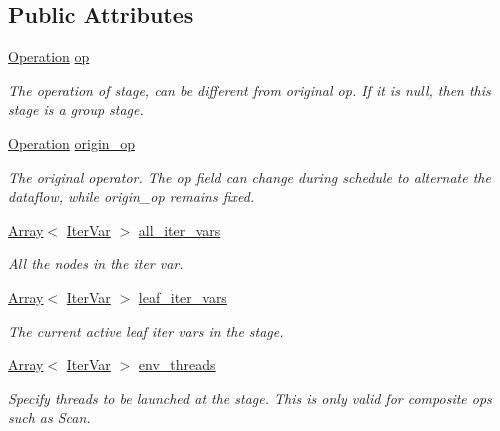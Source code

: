 \subsection*{Public Attributes}
\begin{DoxyCompactItemize}
\item 
\hyperlink{classtvm_1_1te_1_1Operation}{Operation} \hyperlink{classtvm_1_1te_1_1StageNode_a1e98ce6b9c48fd7ec5077c06f35d2ae1}{op}
\begin{DoxyCompactList}\small\item\em The operation of stage, can be different from original op. If it is null, then this stage is a group stage. \end{DoxyCompactList}\item 
\hyperlink{classtvm_1_1te_1_1Operation}{Operation} \hyperlink{classtvm_1_1te_1_1StageNode_a3e7c2fb80404a12a9e843fcb38accd78}{origin\+\_\+op}
\begin{DoxyCompactList}\small\item\em The original operator. The op field can change during schedule to alternate the dataflow, while origin\+\_\+op remains fixed. \end{DoxyCompactList}\item 
\hyperlink{classtvm_1_1Array}{Array}$<$ \hyperlink{classtvm_1_1tir_1_1IterVar}{Iter\+Var} $>$ \hyperlink{classtvm_1_1te_1_1StageNode_ae4592502d1c99f2515be61a6503bb7a6}{all\+\_\+iter\+\_\+vars}
\begin{DoxyCompactList}\small\item\em All the nodes in the iter var. \end{DoxyCompactList}\item 
\hyperlink{classtvm_1_1Array}{Array}$<$ \hyperlink{classtvm_1_1tir_1_1IterVar}{Iter\+Var} $>$ \hyperlink{classtvm_1_1te_1_1StageNode_a80162bcc647f01efa9ab97da3ca57410}{leaf\+\_\+iter\+\_\+vars}
\begin{DoxyCompactList}\small\item\em The current active leaf iter vars in the stage. \end{DoxyCompactList}\item 
\hyperlink{classtvm_1_1Array}{Array}$<$ \hyperlink{classtvm_1_1tir_1_1IterVar}{Iter\+Var} $>$ \hyperlink{classtvm_1_1te_1_1StageNode_ac6bfe27a0802f257d467667522d0cbee}{env\+\_\+threads}
\begin{DoxyCompactList}\small\item\em Specify threads to be launched at the stage. This is only valid for composite ops such as Scan. \end{DoxyCompactList}\item 

\end{DoxyCompactItemize}
